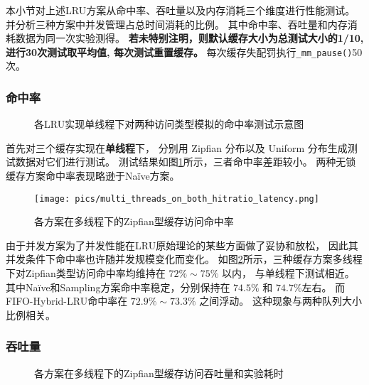 本小节对上述LRU方案从命中率、吞吐量以及内存消耗三个维度进行性能测试。
并分析三种方案中并发管理占总时间消耗的比例。
其中命中率、吞吐量和内存消耗数据为同一次实验测得。
\textbf{若未特别注明，则默认缓存大小为总测试大小的1/10, 进行30次测试取平均值, 每次测试重置缓存。}
每次缓存失配罚执行\verb|_mm_pause()|50次。

\subsubsection{命中率}

\begin{figure}
    \caption{各LRU实现单线程下对两种访问类型模拟的命中率测试示意图}
    \label{fig:dist_on_3_1thread}
\end{figure}

首先对三个缓存实现在\textbf{单线程}下，
分别用 Zipfian 分布以及 Uniform 分布生成测试数据对它们进行测试。
测试结果如图\ref{fig:dist_on_3_1thread}所示，三者命中率差距较小。
两种无锁缓存方案命中率表现略逊于Na\"{i}ve方案。

\begin{figure}
    \centering
    \texttt{[image: pics/multi\_threads\_on\_both\_hitratio\_latency.png]}
    \caption{各方案在多线程下的Zipfian型缓存访问命中率}
    \label{fig:dist_multithread}
\end{figure}

由于并发方案为了并发性能在LRU原始理论的某些方面做了妥协和放松，
因此其并发条件下命中率也许随并发规模变化而变化。
如图\ref{fig:dist_multithread}所示，三种缓存方案多线程下对Zipfian类型访问命中率均维持在 $72\% \sim 75\%$ 以内，
与单线程下测试相近。
其中Na\"{i}ve和Sampling方案命中率稳定，分别保持在 $74.5\%$ 和 $74.7\%$左右。
而FIFO-Hybrid-LRU命中率在 $72.9\% \sim 73.3\%$ 之间浮动。
这种现象与两种队列大小比例相关。

\subsubsection{吞吐量}

\begin{figure}
    \centering
    \caption{各方案在多线程下的Zipfian型缓存访问吞吐量和实验耗时}
    \label{fig:throughput}
\end{figure}

